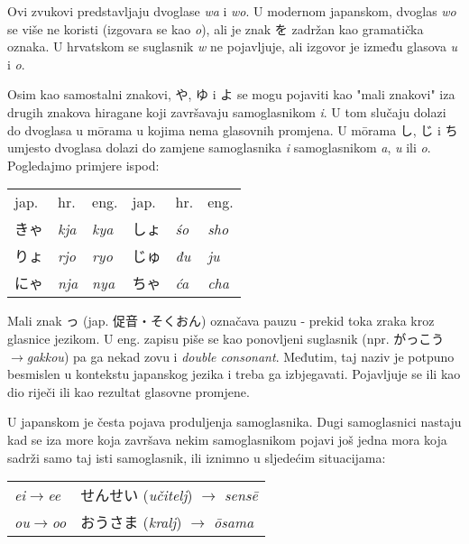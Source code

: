 	Ovi zvukovi predstavljaju dvoglase \textit{wa} i \textit{wo}. U modernom japanskom, dvoglas \textit{wo} se više ne koristi (izgovara se kao \textit{o}), ali je znak を zadržan kao gramatička oznaka. U hrvatskom se suglasnik \textit{w} ne pojavljuje, ali izgovor je između glasova \textit{u} i \textit{o}.
	
	
	Osim kao samostalni znakovi, や, ゆ i よ se mogu pojaviti kao "mali znakovi" iza drugih znakova hiragane koji završavaju samoglasnikom \textit{i}. U tom slučaju dolazi do dvoglasa\footnotemark[3] u m\={o}rama u kojima nema glasovnih promjena. U m\={o}rama し, じ i ち umjesto dvoglasa dolazi do zamjene samoglasnika \textit{i} samoglasnikom \textit{a}, \textit{u} ili \textit{o}. Pogledajmo primjere ispod:
	
	\begin{tabular}{l l l | l l l}
		jap.&hr.&eng.&jap.&hr.&eng.\\
		きゃ&\textit{kja}&\textit{kya}&しょ&\textit{\'{s}o}&\textit{sho}\\
		りょ&\textit{rjo}&\textit{ryo}&じゅ&\textit{đu}&\textit{ju}\\
		にゃ&\textit{nja}&\textit{nya}&ちゃ&\textit{ća}&\textit{cha}\\
	\end{tabular}

	
	Mali znak っ (jap. 促音・そくおん) označava pauzu - prekid toka zraka kroz glasnice jezikom. U eng. zapisu piše se kao ponovljeni suglasnik (npr. がっこう$\rightarrow$\textit{gakkou}) pa ga nekad zovu i \textit{double consonant}. Međutim, taj naziv je potpuno besmislen u kontekstu japanskog jezika i treba ga izbjegavati. Pojavljuje se ili kao dio riječi ili kao rezultat glasovne promjene.
	
	
	U japanskom je česta pojava produljenja samoglasnika. Dugi samoglasnici nastaju kad se iza more koja završava nekim samoglasnikom pojavi još jedna mora koja sadrži samo taj isti samoglasnik, ili iznimno u sljedećim situacijama:
	
	\vspace{5pt}
	\begin{tabular}{l l}
		\textit{ei}$\rightarrow$\textit{ee} & せんせい (\textit{učitelj}) $\rightarrow$ \textit{sens\={e}}\\
		\textit{ou}$\rightarrow$\textit{oo} & おうさま (\textit{kralj}) $\rightarrow$ \textit{\={o}sama}\\
	\end{tabular}

